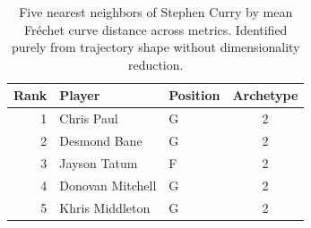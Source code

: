 \begin{table}[htbp]
  \centering\small
  \begin{tabular}{rllc}
    \toprule
    Rank & Player & Position & Archetype \\
    \midrule
    1 & Chris Paul & G & 2 \\
    2 & Desmond Bane & G & 2 \\
    3 & Jayson Tatum & F & 2 \\
    4 & Donovan Mitchell & G & 2 \\
    5 & Khris Middleton & G & 2 \\
    \bottomrule
  \end{tabular}
  \caption{Five nearest neighbors of Stephen Curry by mean Fr\'{e}chet curve distance across metrics. Identified purely from trajectory shape without dimensionality reduction.}
  \label{tab:Stephen_Curry_frechet_curve_neighbors}
\end{table}

